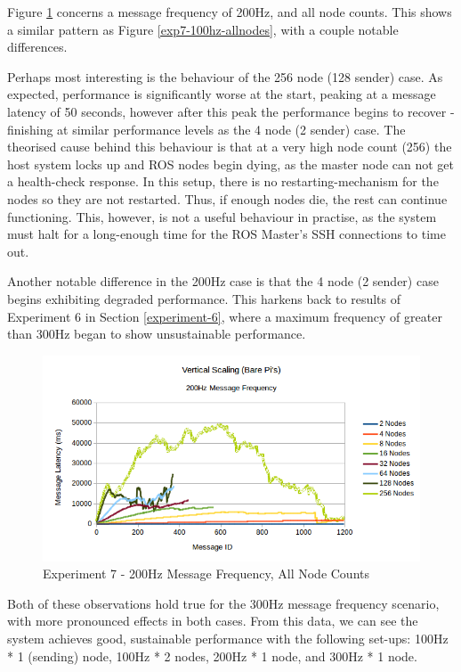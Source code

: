 \documentclass[../dissertation.tex]{subfiles}
\begin{document}
Figure \ref{exp7-200hz-allnodes} concerns a message frequency of 200Hz, and all node counts. This shows a similar pattern as Figure \ref{exp7-100hz-allnodes}, with a couple notable differences.

Perhaps most interesting is the behaviour of the 256 node (128 sender) case. As expected, performance is significantly worse at the start, peaking at a message latency of 50 seconds, however after this peak the performance begins to recover - finishing at similar performance levels as the 4 node (2 sender) case. The theorised cause behind this behaviour is that at a very high node count (256) the host system locks up and ROS nodes begin dying, as the master node can not get a health-check response. In this setup, there is no restarting-mechanism for the nodes so they are not restarted. Thus, if enough nodes die, the rest can continue functioning. This, however, is not a useful behaviour in practise, as the system must halt for a long-enough time for the ROS Master's SSH connections to time out.

Another notable difference in the 200Hz case is that the 4 node (2 sender) case begins exhibiting degraded performance. This harkens back to results of Experiment 6 in Section \ref{experiment-6}, where a maximum frequency of greater than 300Hz began to show unsustainable performance.

\begin{figure}[H]
\centering
\includegraphics[width=\textwidth]{images/experiment7/vertical_scaling_200hz_all_node_counts.png}
\caption{Experiment 7 - 200Hz Message Frequency, All Node Counts}
\label{exp7-200hz-allnodes}
\end{figure}

Both of these observations hold true for the 300Hz message frequency scenario, with more pronounced effects in both cases. From this data, we can see the system achieves good, sustainable performance with the following set-ups: 100Hz * 1 (sending) node, 100Hz * 2 nodes, 200Hz * 1 node, and 300Hz * 1 node.
\end{document}
